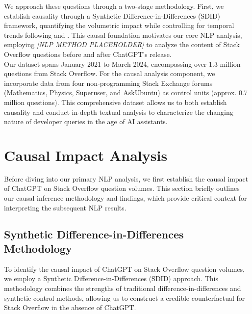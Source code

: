 We approach these questions through a two-stage methodology. First, we establish causality through a Synthetic Difference-in-Differences (SDID) framework, quantifying the volumetric impact while controlling for temporal trends following \textcite{arkhangelsky_synthetic_2021} and \textcite{clarke_synthetic_2023}. This causal foundation motivates our core NLP analysis, employing \textit{[NLP METHOD PLACEHOLDER]} to analyze the content of Stack Overflow questions before and after ChatGPT's release.\\

Our dataset spans January 2021 to March 2024, encompassing over 1.3 million questions from Stack Overflow. For the causal analysis component, we incorporate data from four non-programming Stack Exchange forums (Mathematics, Physics, Superuser, and AskUbuntu) as control units (approx. 0.7 million questions). This comprehensive dataset allows us to both establish causality and conduct in-depth textual analysis to characterize the changing nature of developer queries in the age of AI assistants.

\section{Causal Impact Analysis}
Before diving into our primary NLP analysis, we first establish the causal impact of ChatGPT on Stack Overflow question volumes. This section briefly outlines our causal inference methodology and findings, which provide critical context for interpreting the subsequent NLP results.

\subsection{Synthetic Difference-in-Differences Methodology}
To identify the causal impact of ChatGPT on Stack Overflow question volumes, we employ a Synthetic Difference-in-Differences (SDID) approach. This methodology combines the strengths of traditional difference-in-differences and synthetic control methods, allowing us to construct a credible counterfactual for Stack Overflow in the absence of ChatGPT.\\


